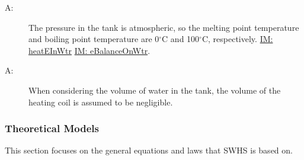 \documentclass[12pt]{article}
\newcounter{assumpnum}
\newcommand{\atheassumpnum}{A\theassumpnum}
\begin{document}
\begin{description}
\item[\atheassumpnum\label{A:Atmospheric-Pressure-Tank}:]The pressure in the tank is atmospheric, so the melting point temperature and boiling point temperature are 0${}^{\circ}$C and 100${}^{\circ}$C, respectively. \hyperref[IM:heatEInWtr]{IM: heatEInWtr} \hyperref[IM:eBalanceOnWtr]{IM: eBalanceOnWtr}.
\end{description}
\begin{description}
\item[\atheassumpnum\label{A:Volume-Coil-Negligible}:]When considering the volume of water in the tank, the volume of the heating coil is assumed to be negligible.
\end{description}
\subsubsection{Theoretical Models}
\label{Sec:TMs}
This section focuses on the general equations and laws that SWHS is based on.
~\newline
\end{document}
